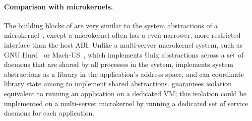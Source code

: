 

\paragraph{Comparison with microkernels.}
The building blocks of \graphene{} are very similar to the system abstractions of a 
microkernel~\cite{liedtke95sosp,klein09sel4,elphinstone13microkernels,liedtke93sosp,chen93memory,baron1985mach-1,accetta86mach}, except a microkernel often has a even narrower, more restricted interface than the host ABI.
Unlike a multi-server microkernel system, such as GNU Hurd~\cite{hurd} or Mach-US~\cite{stevenson95mach-us}, which implements Unix abstractions across a set of daemons that are shared by all processes in the system, \graphene{} implements system abstractions as a library in the application's address space, and can coordinate library state among \picoprocs{} to implement shared abstractions. \graphene{} guarantees isolation equivalent to running 
an application on a dedicated VM; this isolation could be implemented on a multi-server microkernel by running a dedicated set of service daemons for each application.



